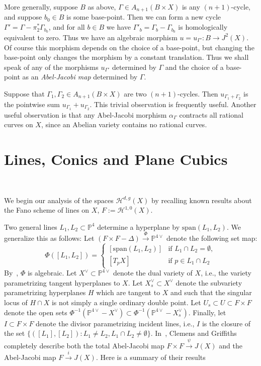 \documentclass[twoside,12pt,reqno]{amsart}
\theoremstyle{plain}
\theoremstyle{definition}
\newcommand{\Hdg}[2]{\mathcal{H}^{#1,#2}}
\newcommand{\PP}{\mathbb{P}}
\def\ps{\vspace{4pt}}
\newcommand{\lt}{\left}
\newcommand{\rt}{\right}
\renewcommand{\xrightarrow}[1]{\mathbin{\stackrel{#1}{\longrightarrow}}}
\begin{document}
\ps

More generally, suppose $B$ as above, $\Gamma\in A_{n+1}(B\times
X)$ is any $(n+1)$-cycle, and suppose $b_0\in B$ is some base-point.
Then we can form a new cycle $\Gamma'=\Gamma - \pi_2^*\Gamma_{b_0}$,
and for all $b\in B$ we have $\Gamma'_b = \Gamma_b - \Gamma_{b_0}$ is
homologically equivalent to zero.  Thus we have an algebraic morphism
$u=u_{\Gamma'}:B\rightarrow J^2(X)$.  Of course this morphism depends
on the choice of a base-point, but changing the base-point only
changes the morphism by a constant translation.  Thus we shall speak
of any of the morphisms $u_{\Gamma'}$ determined by $\Gamma$ and the
choice of a base-point as an \emph{Abel-Jacobi map} determined by
$\Gamma$.  

\ps

Suppose that $\Gamma_1,\Gamma_2\in A_{n+1}(B\times X)$ are two
$(n+1)$-cycles.  Then $u_{\Gamma_1+\Gamma_2}$ is the pointwise sum
$u_{\Gamma_1}+u_{\Gamma_2}$.  This trivial observation is frequently
useful.  Another useful observation is that any Abel-Jacobi morphism
$\alpha_\Gamma$ contracts all rational curves on $X$, since an Abelian 
variety contains no rational curves.

\section{Lines, Conics and Plane Cubics}~\label{sec-123}

We begin our analysis of the spaces $\Hdg{d}{g}(X)$ by recalling known 
results about the Fano scheme of lines on $X$, $F:=\Hdg{1}{0}(X)$.  

\ps

Two general lines $L_1,L_2\subset \PP^4$ determine a hyperplane by
$\text{span}(L_1,L_2)$.  We generalize this as follows:
Let $(F\times F-\Delta)\xrightarrow{\Phi} 
\PP^{4\vee}$ denote the following set map:
\begin{equation}\label{eqn-16}
 \Phi \left( [L_1,L_2] \right) =
  \left\{ \begin{array}{ll}
    \lt[ \text{span} \left( L_1,L_2 \right)\rt] &\text{if }L_1\cap L_2
  = \emptyset,  \\
  \lt[T_p X\rt]  & \text{if }p\in L_1\cap L_2
 \end{array} \right.
\end{equation} 
By~\cite[lemma 12.16]{CG}, $\Phi$ is algebraic.  
Let $X^\vee\subset \PP^{4\vee}$ denote the dual variety of $X$,
i.e., the variety 
parametrizing tangent hyperplanes to $X$.  Let $X^\vee_s\subset
X^\vee$ denote 
the subvariety parametrizing hyperplanes $H$ which are tangent to $X$ and
such that the singular locus of $H\cap X$ is not simply a single ordinary 
double point.  Let $U_s\subset U\subset F\times F$ denote the open
sets $\Phi^{-1}\lt(\PP^{4\vee} - X^\vee\rt)\subset \Phi^{-1}\lt(\PP^{4\vee} - 
X^\vee_s\rt)$.  Finally, let $I\subset F\times F$ denote the divisor
parametrizing 
incident lines, i.e., $I$ is the closure of the set $\{\lt([L_1],[L_2]\rt) 
: L_1\neq L_2, L_1\cap L_2\neq\emptyset\}$.
In~\cite{CG}, Clemens and Griffiths completely describe both
the total 
Abel-Jacobi map $F\times F\xrightarrow{\psi} J(X)$ and the
Abel-Jacobi map $F\xrightarrow{i} J(X)$.  Here is a summary of their results
\end{document}
